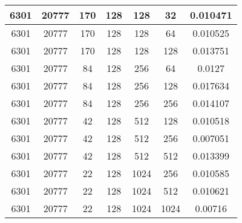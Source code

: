 \documentclass[9pt]{article}
\begin{document}
\begin{tabular}{|c|c|c|c|c|c|c| }
\hline
6301  & 20777  & 170  & 128  & 128  & 32  & 0.010471 \\
\hline
6301  & 20777  & 170  & 128  & 128  & 64  & 0.010525 \\
\hline
6301  & 20777  & 170  & 128  & 128  & 128  & 0.013751 \\
\hline
6301  & 20777  & 84  & 128  & 256  & 64  & 0.0127 \\
\hline
6301  & 20777  & 84  & 128  & 256  & 128  & 0.017634 \\
\hline
6301  & 20777  & 84  & 128  & 256  & 256  & 0.014107 \\
\hline
6301  & 20777  & 42  & 128  & 512  & 128  & 0.010518 \\
\hline
6301  & 20777  & 42  & 128  & 512  & 256  & 0.007051 \\
\hline
6301  & 20777  & 42  & 128  & 512  & 512  & 0.013399 \\
\hline
6301  & 20777  & 22  & 128  & 1024  & 256  & 0.010585 \\
\hline
6301  & 20777  & 22  & 128  & 1024  & 512  & 0.010621 \\
\hline
6301  & 20777  & 22  & 128  & 1024  & 1024  & 0.00716 \\
\hline
\end{tabular}
 
\end{document}
